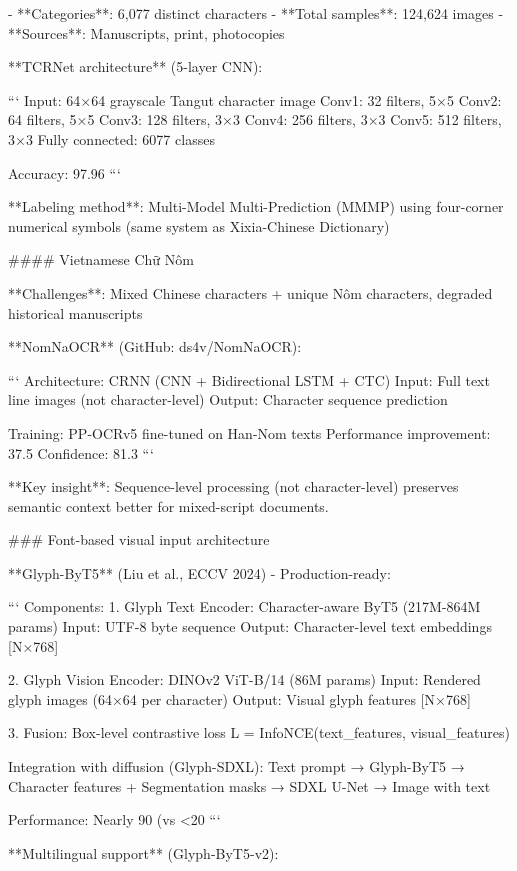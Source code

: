 \documentclass[11pt]{article}
\begin{document}
- **Categories**: 6,077 distinct characters
- **Total samples**: 124,624 images
- **Sources**: Manuscripts, print, photocopies

**TCRNet architecture** (5-layer CNN):

```
Input: 64×64 grayscale Tangut character image
Conv1: 32 filters, 5×5
Conv2: 64 filters, 5×5  
Conv3: 128 filters, 3×3
Conv4: 256 filters, 3×3
Conv5: 512 filters, 3×3
Fully connected: 6077 classes

Accuracy: 97.96%
```

**Labeling method**: Multi-Model Multi-Prediction (MMMP) using four-corner numerical symbols (same system as Xixia-Chinese Dictionary)

#### Vietnamese Chữ Nôm

**Challenges**: Mixed Chinese characters + unique Nôm characters, degraded historical manuscripts

**NomNaOCR** (GitHub: ds4v/NomNaOCR):

```
Architecture: CRNN (CNN + Bidirectional LSTM + CTC)
Input: Full text line images (not character-level)
Output: Character sequence prediction

Training: PP-OCRv5 fine-tuned on Han-Nom texts
Performance improvement: 37.5%
Confidence: 81.3%
```

**Key insight**: Sequence-level processing (not character-level) preserves semantic context better for mixed-script documents.

### Font-based visual input architecture

**Glyph-ByT5** (Liu et al., ECCV 2024) - Production-ready:

```
Components:
1. Glyph Text Encoder: Character-aware ByT5 (217M-864M params)
   Input: UTF-8 byte sequence
   Output: Character-level text embeddings [N×768]

2. Glyph Vision Encoder: DINOv2 ViT-B/14 (86M params)
   Input: Rendered glyph images (64×64 per character)
   Output: Visual glyph features [N×768]

3. Fusion: Box-level contrastive loss
   L = InfoNCE(text_features, visual_features)
   
Integration with diffusion (Glyph-SDXL):
   Text prompt → Glyph-ByT5 → Character features
   + Segmentation masks → SDXL U-Net → Image with text

Performance: Nearly 90%
            (vs <20%
```

**Multilingual support** (Glyph-ByT5-v2):
\end{document}
